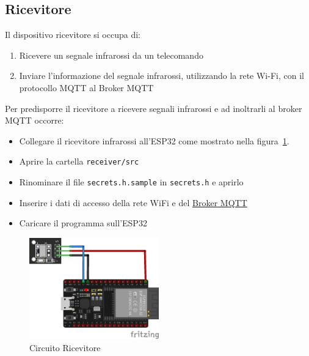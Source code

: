 \documentclass[a4paper,11pt]{article}
\begin{document}
    \subsection{Ricevitore}
    \label{subsec:receiver}

    Il dispositivo ricevitore si occupa di:

    \begin{enumerate}
        \item Ricevere un segnale infrarossi da un telecomando
        \item Inviare l'informazione del segnale infrarossi, utilizzando la rete Wi-Fi, con il protocollo MQTT al Broker MQTT
    \end{enumerate}

    Per predisporre il ricevitore a ricevere segnali infrarossi e ad inoltrarli al broker MQTT occorre:
    \begin{itemize}
        \item Collegare il ricevitore infrarossi all'ESP32 come mostrato nella figura~\ref{fig:circuito_ricevitore}.


        \item Aprire la cartella \texttt{receiver/src}
        \item Rinominare il file \texttt{secrets.h.sample} in \texttt{secrets.h} e aprirlo
        \item Inserire i dati di accesso della rete WiFi e del \hyperref[subsec:Broker]{Broker MQTT}
        \item Caricare il programma sull'ESP32
    \end{itemize}

    \begin{figure}[H]
      \centering
      \includegraphics[width=0.5\textwidth,height=\textheight,keepaspectratio]{assets/receiver_fritzing}
      \caption{Circuito Ricevitore}
      \label{fig:circuito_ricevitore}
    \end{figure}
\end{document}
